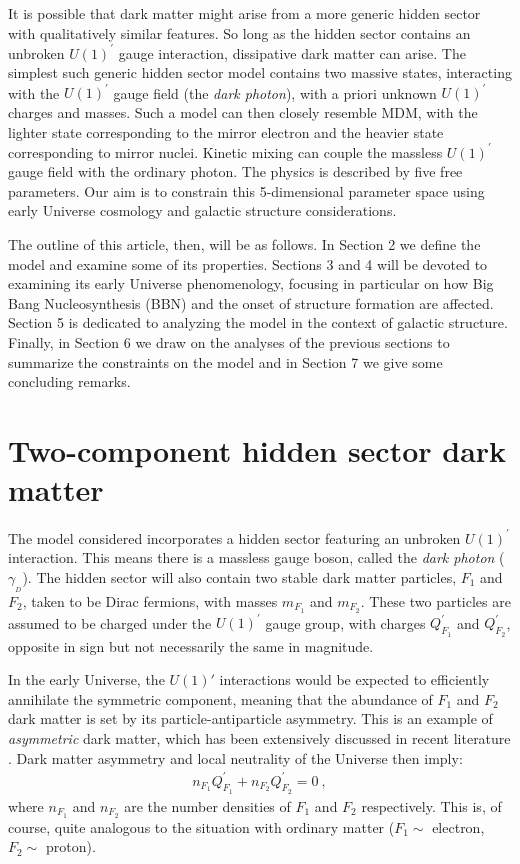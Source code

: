 \documentclass[12pt]{article}
\begin{document}
It is possible that dark matter might arise from a more generic hidden sector with qualitatively similar features. So long as the hidden sector contains an unbroken $U(1) ^{'}$ gauge interaction, dissipative dark matter can arise. The simplest such generic hidden sector model contains two massive states, interacting with the $U(1) ^{'}$ gauge field (the \textit{dark photon}), with a priori unknown $U(1) ^{'}$ charges and masses. Such a model can then closely resemble MDM, with the lighter state corresponding to the mirror electron and the heavier state corresponding to mirror nuclei. Kinetic mixing can couple the massless $U(1) ^{'}$ gauge field with the ordinary photon. The physics is described by five free parameters. Our aim is to constrain this 5-dimensional parameter space using early Universe cosmology and galactic structure considerations.

The outline of this article, then, will be as follows. In Section 2 we define the model and examine some of its properties. Sections 3 and 4 will be devoted to examining its early Universe phenomenology, focusing in particular on how Big Bang Nucleosynthesis (BBN) and the onset of structure formation are affected. Section 5 is dedicated to analyzing the model in the context of galactic structure. Finally, in Section 6 we draw on the analyses of the previous sections to summarize the constraints on the model and in Section 7 we give some concluding remarks.

\section{Two-component hidden sector dark matter}

The model considered incorporates a hidden sector featuring an unbroken $U(1) ^{'}$ interaction. This means there is a massless gauge boson, called the \textit{dark photon} ($\gamma _{_D}$). The hidden sector will also contain two stable dark matter particles, $F_1$ and $F_2$, taken to be Dirac fermions, with masses $m _{F_1}$ and $m _{F_2}$. These two particles are assumed to be charged under the $U(1) ^{'}$ gauge group, with charges $Q _{F_1} ^{'}$ and $Q _{F_2} ^{'}$, opposite in sign but not necessarily the same in magnitude.

In the early Universe, the $U(1)'$ interactions would be expected to efficiently annihilate the symmetric component, meaning that the abundance of $F_1$ and $F_2$ dark matter is set by its particle-antiparticle asymmetry. This is an example of \textit{asymmetric} dark matter, which has been extensively discussed in recent literature \cite{reviewadm}. Dark matter asymmetry and local neutrality of the Universe then imply:
%
\begin{eqnarray}
n _{F_1}Q _{F_1} ^{'} + n _{F_2}Q _{F_2} ^{'} = 0 \ ,
\end{eqnarray}
%
where $n _{F_1}$ and $n _{F_2}$ are the number densities of $F _1$ and $F _2$ respectively. This is, of course, quite analogous to the situation with ordinary matter ($F_1 \sim$ electron, $F_2 \sim$ proton).
\end{document}
